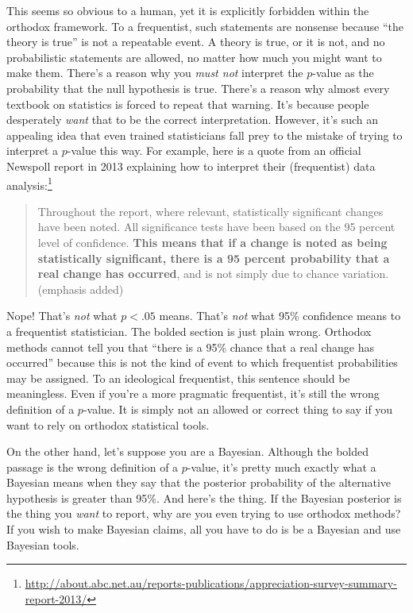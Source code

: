 \documentclass[
  11pt,
  a4paper,
  twoside,symmetric,openright]{book}
\theoremstyle{break}
\theoremstyle{break}
\begin{document}
This seems so obvious to a human, yet it is explicitly forbidden within the orthodox framework. To a frequentist, such statements are nonsense because ``the theory is true'' is not a repeatable event. A theory is true, or it is not, and no probabilistic statements are allowed, no matter how much you might want to make them. There's a reason why you \emph{must not} interpret the \(p\)-value as the probability that the null hypothesis is true. There's a reason why almost every textbook on statistics is forced to repeat that warning. It's because people desperately \emph{want} that to be the correct interpretation. However, it's such an appealing idea that even trained statisticians fall prey to the mistake of trying to interpret a \(p\)-value this way. For example, here is a quote from an official Newspoll report in 2013 explaining how to interpret their (frequentist) data analysis:\footnote{\url{http://about.abc.net.au/reports-publications/appreciation-survey-summary-report-2013/}}

\begin{quote}
Throughout the report, where relevant, statistically significant changes have been noted. All significance tests have been based on the 95 percent level of confidence. \textbf{This means that if a change is noted as being statistically significant, there is a 95 percent probability that a real change has occurred}, and is not simply due to chance variation. (emphasis added)
\end{quote}

Nope! That's \emph{not} what \(p<.05\) means. That's \emph{not} what 95\% confidence means to a frequentist statistician. The bolded section is just plain wrong. Orthodox methods cannot tell you that ``there is a 95\% chance that a real change has occurred'' because this is not the kind of event to which frequentist probabilities may be assigned. To an ideological frequentist, this sentence should be meaningless. Even if you're a more pragmatic frequentist, it's still the wrong definition of a \(p\)-value. It is simply not an allowed or correct thing to say if you want to rely on orthodox statistical tools.

On the other hand, let's suppose you are a Bayesian. Although the bolded passage is the wrong definition of a \(p\)-value, it's pretty much exactly what a Bayesian means when they say that the posterior probability of the alternative hypothesis is greater than 95\%. And here's the thing. If the Bayesian posterior is the thing you \emph{want} to report, why are you even trying to use orthodox methods? If you wish to make Bayesian claims, all you have to do is be a Bayesian and use Bayesian tools.
\end{document}
